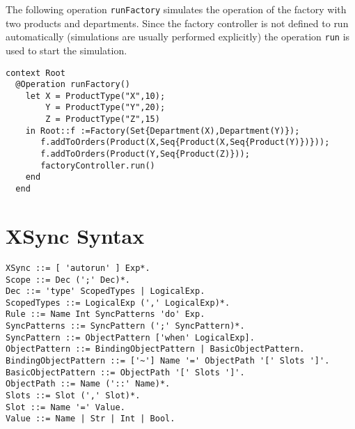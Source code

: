 \documentclass{article}
\begin{document}
The following operation {\tt runFactory} simulates the operation of the
factory with  two products and departments. Since the factory controller
is not defined to run automatically (simulations are usually performed
explicitly) the operation {\tt run} is used to start the simulation.
\begin{verbatim}
context Root
  @Operation runFactory()
    let X = ProductType("X",10);
        Y = ProductType("Y",20);
        Z = ProductType("Z",15)
    in Root::f :=Factory(Set{Department(X),Department(Y)});
       f.addToOrders(Product(X,Seq{Product(X,Seq{Product(Y)})}));
       f.addToOrders(Product(Y,Seq{Product(Z)}));
       factoryController.run()
    end
  end
\end{verbatim}

\appendix

\section{XSync Syntax}

\begin{verbatim}
XSync ::= [ 'autorun' ] Exp*.
Scope ::= Dec (';' Dec)*.    
Dec ::= 'type' ScopedTypes | LogicalExp.     
ScopedTypes ::= LogicalExp (',' LogicalExp)*.     
Rule ::= Name Int SyncPatterns 'do' Exp.      
SyncPatterns ::= SyncPattern (';' SyncPattern)*.     
SyncPattern ::= ObjectPattern ['when' LogicalExp].      
ObjectPattern ::= BindingObjectPattern | BasicObjectPattern.     
BindingObjectPattern ::= ['~'] Name '=' ObjectPath '[' Slots ']'.     
BasicObjectPattern ::= ObjectPath '[' Slots ']'.      
ObjectPath ::= Name ('::' Name)*.      
Slots ::= Slot (',' Slot)*.      
Slot ::= Name '=' Value.      
Value ::= Name | Str | Int | Bool.
\end{verbatim}
\end{document}
